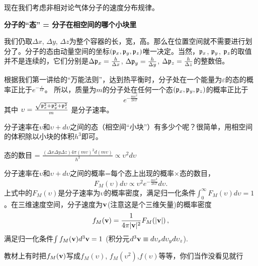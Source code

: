 \documentclass[CJK]{beamer}
\begin{document}
\begin{frame}
\bch
现在我们考虑非相对论气体分子的速度分布规律。

\skipline

{\blue \bf 分子的“态” = 分子在相空间的哪个小块里 }

\skipline

我们仍取$\Delta x$, $\Delta y$, $\Delta z$为整个容器的长，宽，高。那么在位置空间就不需要进行划分了。分子的态由动量空间的坐标$({\mathfrak{p}}_x, {\mathfrak{p}}_y, {\mathfrak{p}}_z)$唯一决定。当然，${\mathfrak{p}}_x$, ${\mathfrak{p}}_y$, ${\mathfrak{p}}_z$的取值并不是连续的，它们分别是$\Delta {\mathfrak{p}}_x=\frac{h}{\Delta x}$, $\Delta {\mathfrak{p}}_y=\frac{h}{\Delta y}$, $\Delta {\mathfrak{p}}_z=\frac{h}{\Delta z}$的整数倍。

\skipline
根据我们第一讲给的“万能法则”，达到热平衡时，分子处在一个能量为$\varepsilon$的态的概率正比于$e^{-\frac{\varepsilon}{kT}}$。
所以，质量为$m$的分子处在任何一个态$({\mathfrak{p}}_x, {\mathfrak{p}}_y, {\mathfrak{p}}_z)$的概率正比于
$$e^{-\frac{m\upsilon^2}{2kT}}$$
其中
$\upsilon = \frac{\sqrt{{\mathfrak{p}}_x^2 +{\mathfrak{p}}_y^2+ {\mathfrak{p}}_z^2}}{m}$
是分子速率。
\ech
\end{frame}

\begin{frame}
\bch
分子速率在$\upsilon$和$\upsilon+d\upsilon$之间的态（相空间“小块”）有多少个呢？很简单，用相空间的体积除以小块的体积$h^3$即可。

\skipline


态的数目 = $ \frac{(\Delta x \Delta y \Delta z )4\pi (m\upsilon)^2d(m\upsilon)}{h^3}\propto \upsilon^2d\upsilon$
\ech
\end{frame}

\begin{frame}
\bch
{\small 分子速率在$\upsilon$和$\upsilon+d\upsilon$之间的概率=每个态上出现的概率$\times$态的数目}，
$$F_M(\upsilon) d\upsilon \propto \upsilon^2 e^{-\frac{m\upsilon^2}{2kT}}d\upsilon.$$
上式中的$F_M(\upsilon)$是分子速率为$\upsilon$的概率密度，满足归一化条件$\int_0^\infty F_M(\upsilon)d\upsilon = 1$。在三维速度空间，分子速度为${\mathbf{v}}$(注意这是个三维矢量)的概率密度
$$f_M({\mathbf{v}}) = \frac{1}{4\pi|{\mathbf{v}}|^2}F_M(|{\mathbf{v}}|)\, ,$$
满足归一化条件$\int f_M({\mathbf{v}}) d^3{\mathbf{v}} = 1$ (积分元$d^3{\mathbf{v}} \equiv d\upsilon_xd\upsilon_yd\upsilon_z$).

教材上有时把$f_M({\mathbf{v}})$写成$f_M(\upsilon)$, $f_M(\upsilon^2)$,$f(\upsilon)$等等，你们当作没看见就行\wulian

\ech
\end{frame}
\end{document}
